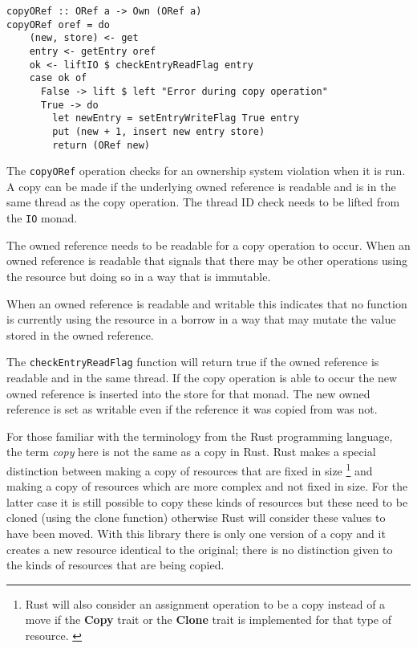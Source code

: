 \documentclass[onehalf,11pt]{beavtex}
\begin{document}
\begin{verbatim}
copyORef :: ORef a -> Own (ORef a)
copyORef oref = do
    (new, store) <- get
    entry <- getEntry oref
    ok <- liftIO $ checkEntryReadFlag entry
    case ok of
      False -> lift $ left "Error during copy operation"
      True -> do
        let newEntry = setEntryWriteFlag True entry
        put (new + 1, insert new entry store)
        return (ORef new)
\end{verbatim}

The \texttt{copyORef} operation checks for an ownership system violation when
it is run.  A copy can be made if the underlying owned reference is readable
and is in the same thread as the copy operation.
The thread ID check needs to be lifted from the \texttt{IO} monad.

The owned reference needs to be readable for a copy operation to occur.
When an owned reference is readable that signals that there may be other
operations using the resource but doing so in a way that is immutable.

When an owned reference is readable and writable this indicates that no function
is currently using the resource in a borrow in a way that may mutate the value
stored in the owned reference.

The \texttt{checkEntryReadFlag} function will return true if the owned reference
is readable and in the same thread.
If the copy operation is able to occur the new owned reference is inserted into
the store for that monad. The new owned reference is set as writable even if
the reference it was copied from was not.

For those familiar with the terminology from the Rust programming language, the
term \textit{copy} here is not the same as a copy in Rust. Rust makes a special
distinction between making a copy of resources that are fixed in size
\footnote{Rust will also consider an assignment operation to be a copy instead
  of a move if the \textbf{Copy} trait or the \textbf{Clone} trait is
  implemented for that type of resource. \cite{rust_book_traits}
  \cite{rust_docs_clone_trait}}
and making a copy of resources which are more complex and not fixed in size.
For the latter case it is still possible to copy these kinds of resources but these
need to be cloned (using the clone function) otherwise Rust will consider these
values to have been moved. \cite{rust_book_ownership}
With this library there is only one version of a copy and it creates a new
resource identical to the original; there is no distinction given to the kinds
of resources that are being copied.
\end{document}
